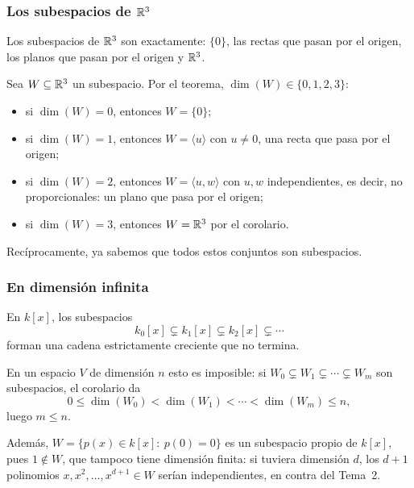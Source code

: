 \begin{frame}
    \frametitle{Los subespacios de $\mathbb{R}^3$}

    \begin{example}
        Los subespacios de $\mathbb{R}^3$ son exactamente: $\{0\}$, las rectas que
        pasan por el origen, los planos que pasan por el origen y $\mathbb{R}^3$.
    \end{example}

    \medskip

    Sea $W\subseteq\mathbb{R}^3$ un subespacio. Por el teorema,
    $\dim(W)\in\{0,1,2,3\}$:
    \begin{itemize}
        \item si $\dim(W)=0$, entonces $W=\{0\}$;
        \item si $\dim(W)=1$, entonces $W=\langle u\rangle$ con $u\neq0$, una
        \alert{recta} que pasa por el origen;
        \item si $\dim(W)=2$, entonces $W=\langle u,w\rangle$ con $u,w$
        independientes, es decir, no proporcionales: un \alert{plano} que
        pasa por el origen;
        \item si $\dim(W)=3$, entonces $W=\mathbb{R}^3$ por el corolario.
    \end{itemize}

    \medskip

    Recíprocamente, ya sabemos que todos estos conjuntos son subespacios.
\end{frame}

\begin{frame}
    \frametitle{En dimensión infinita}

    \begin{example}
        En $k[x]$, los subespacios
        \[
            k_0[x]\subsetneq k_1[x]\subsetneq k_2[x]\subsetneq\cdots
        \]
        forman una cadena estrictamente creciente que no termina.
    \end{example}

    \medskip

    En un espacio $V$ de dimensión $n$ esto es imposible: si
    $W_0\subsetneq W_1\subsetneq\cdots\subsetneq W_m$ son subespacios,
    el corolario da
    \[
        0\leq\dim(W_0)<\dim(W_1)<\cdots<\dim(W_m)\leq n,
    \]
    luego $m\leq n$.

    \medskip

    Además, $W=\{p(x)\in k[x]:\ p(0)=0\}$ es un subespacio
    \alert{propio} de $k[x]$, pues $1\notin W$, que tampoco tiene dimensión
    finita: si tuviera dimensión $d$, los $d+1$ polinomios
    $x,x^2,\ldots,x^{d+1}\in W$ serían independientes, en contra del Tema~2.
\end{frame}

